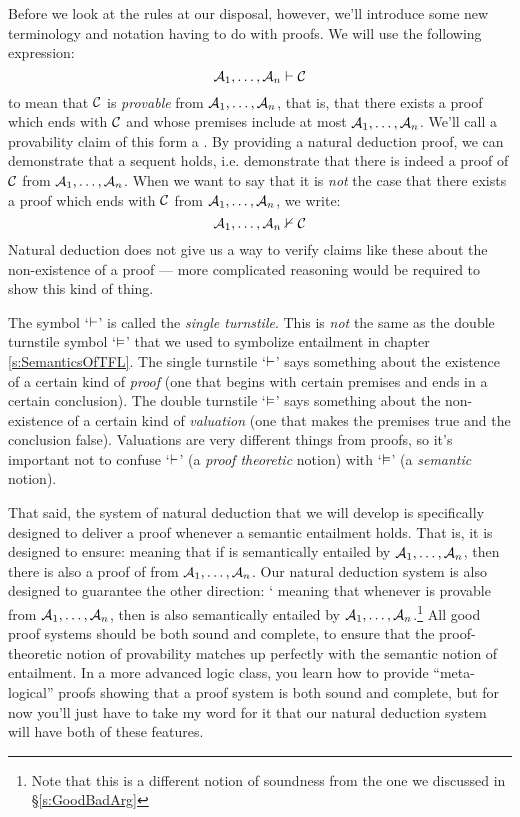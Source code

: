 Before we look at the rules at our disposal, however, we'll introduce some new terminology and notation having to do with proofs.  We will use the following expression:
$$\mathcal{A}_1, \ldots, \mathcal{A}_n \vdash \mathcal{C}$$
to mean that $\mathcal{C}$ is \emph{provable} from $\mathcal{A}_1, \ldots, \mathcal{A}_n$, that is, that there exists a proof which ends with $\mathcal{C}$ and whose premises include at most $\mathcal{A}_1, \ldots, \mathcal{A}_n$. We'll call a provability claim of this form a .  By providing a natural deduction proof, we can demonstrate that a sequent holds, i.e. demonstrate that there is indeed a proof of $\mathcal{C}$ from $\mathcal{A}_1, \ldots, \mathcal{A}_n$.  When we want to say that it is \emph{not} the case that there exists a proof which ends with $\mathcal{C}$ from $\mathcal{A}_1, \ldots, \mathcal{A}_n$, we write:
$$\mathcal{A}_1, \ldots, \mathcal{A}_n \nvdash \mathcal{C}$$
Natural deduction does not give us a way to verify claims like these about the non-existence of a proof --- more complicated reasoning would be required to show this kind of thing.


The symbol `$\vdash$' is called the \emph{single turnstile}.  This is \emph{not} the same as the double turnstile symbol `$\vDash$' that we used to symbolize entailment in chapter \ref{s:SemanticsOfTFL}. The single turnstile `$\vdash$' says something about the existence of a certain kind of \emph{proof} (one that begins with certain premises and ends in a certain conclusion).  The double turnstile `$\vDash$' says something about the non-existence of a certain kind of \emph{valuation} (one that makes the premises true and the conclusion false).  Valuations are very different things from proofs, so it's important not to confuse `$\vdash$' (a \emph{proof theoretic} notion) with `$\vDash$' (a \emph{semantic} notion).

That said, the system of natural deduction that we will develop is specifically designed to deliver a proof whenever a semantic entailment holds.  That is, it is designed to ensure:
meaning that if  is semantically entailed by $\mathcal{A}_1, \ldots, \mathcal{A}_n$, then there is also a proof of  from $\mathcal{A}_1, \ldots, \mathcal{A}_n$.    Our natural deduction system is also designed to guarantee the other direction:
`
meaning that whenever  is provable from $\mathcal{A}_1, \ldots, \mathcal{A}_n$, then  is also semantically entailed by $\mathcal{A}_1, \ldots, \mathcal{A}_n$.\footnote{Note that this is a different notion of soundness from the one we discussed in \S \ref{s:GoodBadArg}}  All good proof systems should be both sound and complete, to ensure that the proof-theoretic notion of provability matches up perfectly with the semantic notion of entailment. In a more advanced logic class, you learn how to provide ``meta-logical'' proofs showing that a proof system is both sound and complete, but for now you'll just have to take my word for it that our natural deduction system will have both of these features.   
  
